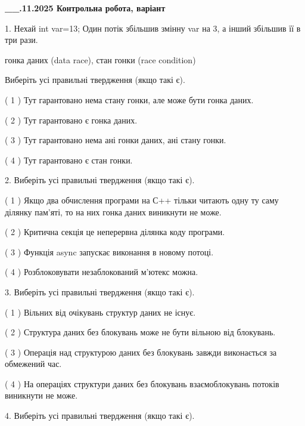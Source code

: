 \documentclass[12pt, ukrainian]{article}
\begin{document}
\newpage
\begin {large}

\textbf{\_\_.11.2025 Контрольна робота, варіант  }\par


{
1. Нехай int var=13; Один потік збільшив змінну var на 3, а інший збільшив її в три рази.

гонка даних (data race), стан гонки (race condition)

Виберіть усі правильні твердження (якщо такі є).\par
\vspace{2mm}
( 1 ) Тут гарантовано нема стану гонки, але може бути гонка даних.%

( 2 ) Тут гарантовано є гонка даних.%

( 3 ) Тут гарантовано нема ані гонки даних, ані стану гонки.%

( 4 ) Тут гарантовано є стан гонки.%


2. Виберіть усі правильні твердження (якщо такі є).\par
\vspace{2mm}

( 1 ) Якщо два обчислення програми на С++ тільки читають одну ту саму ділянку пам'яті, то на них гонка даних  виникнути не може.%

( 2 ) Критична секція це неперервна ділянка коду програми.%

( 3 ) Функція async запускає виконання в новому потоці.%

( 4 ) Розблоковувати незаблокований м’ютекс можна.%


3. Виберіть усі правильні твердження (якщо такі є).\par
\vspace{2mm}

( 1 ) Вільних від очікувань структур даних не існує.%

( 2 ) Структура даних без блокувань може не бути вільною від блокувань.%

( 3 ) Операція над структурою даних без блокувань завжди виконається за обмежений час.%

( 4 ) На операціях структури даних без блокувань взаємоблокувань потоків виникнути не може.%


4. Виберіть усі правильні твердження (якщо такі є).\par
\vspace{2mm}

}
\end{large}
\end{document}
